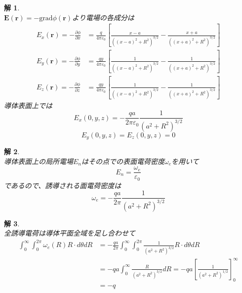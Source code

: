\documentclass{jsarticle}
\newtheorem{ans}{解}[section]
\begin{document}
\begin{ans}~\\
\(\bm{E}(\bm{r})=-\mathrm{grad}\phi(\bm{r})\)より電場の各成分は
\begin{align*}
E_{x}(\bm{r})=-\frac{\partial\phi}{\partial x}&=\frac{q}{4\pi\varepsilon_{0}}\left[\frac{x-a}{((x-a)^{2}+R^2)^{3/2}}-\frac{x+a}{((x+a)^{2}+R^2)^{3/2}}\right]\\
E_{y}(\bm{r})=-\frac{\partial\phi}{\partial y}&=\frac{qy}{4\pi\varepsilon_{0}}\left[\frac{1}{((x-a)^2+R^2)^{3/2}}-\frac{1}{((x+a)^{2}+R^2)^{3/2}}\right]\\
E_{z}(\bm{r})=-\frac{\partial\phi}{\partial z}&=\frac{qy}{4\pi\varepsilon_{0}}\left[\frac{1}{((x-a)^2+R^2)^{3/2}}-\frac{1}{((x+a)^{2}+R^2)^{3/2}}\right]
\end{align*}
導体表面上では
\[E_{x}(0,y,z)=-\frac{qa}{2\pi\varepsilon_{0}}\frac{1}{(a^2+R^2)^{3/2}}\]
\[E_{y}(0,y,z)=E_{z}(0,y,z)=0\]
\end{ans}

\begin{ans}~\\
導体表面上の局所電場\(E_{n}\)はその点での表面電荷密度\(\omega_{e}\)を用いて
\[E_{n}=\frac{\omega_{e}}{\varepsilon_{0}}\]
であるので、誘導される面電荷密度は
\[\omega_{e}=-\frac{qa}{2\pi}\frac{1}{(a^2+R^2)^{3/2}}\]
\end{ans}

\begin{ans}~\\
全誘導電荷は導体平面全域を足し合わせて
\begin{align*}
\int_{0}^{\infty}\int_{0}^{2\pi}\omega_{e}(R)R\cdot d\theta dR&=-\frac{qa}{2\pi}\int_{0}^{\infty}\int_{0}^{2\pi}\frac{1}{(a^2+R^2)^{3/2}}R\cdot d\theta dR\\
&=-qa\int_{0}^{\infty}\frac{R}{(a^2+R^2)^{3/2}}dR=-qa\left[\frac{1}{(a^2+R^2)^{1/2}}\right]_{0}^{\infty}\\
&=-q
\end{align*}
\end{ans}
\end{document}
